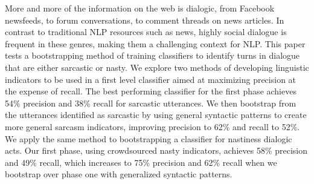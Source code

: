 More and more of the information on the web is dialogic, from Facebook newsfeeds, to forum
 conversations, to comment threads on
 news articles. In contrast to traditional NLP
 resources such as news, highly social dialogue
 is frequent in these genres, making them a
 challenging context for NLP. This paper tests
 a bootstrapping method of training classifiers
 to identify turns in dialogue that are either sarcastic
 or nasty. We explore two methods of
 developing linguistic indicators to be used in a
 first level classifier aimed at maximizing precision
 at the expense of recall. The best performing
 classifier for the first phase achieves
 54\% precision and 38\% recall for sarcastic utterances.
 We then bootstrap from the utterances
 identified as sarcastic by using general
 syntactic patterns to create more general sarcasm
 indicators, improving precision to 62\%
 and recall to 52\%. We apply the same method
 to bootstrapping a classifier for nastiness dialogic
 acts. Our first phase, using crowdsourced
 nasty indicators, achieves 58\% precision
 and 49\% recall, which increases to 75\%
 precision and 62\% recall when we bootstrap
 over phase one with generalized syntactic patterns.

